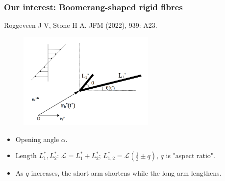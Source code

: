 \documentclass{beamer}
\newcommand{\bi}{\begin{itemize}}
\newcommand{\ei}{\end{itemize}}
\begin{document}
\begin{frame}
	\frametitle{Our interest: Boomerang-shaped rigid fibres}
	\begin{overlayarea}{\textwidth}{\textheight}
		\vspace{-0.5cm}\footnotesize Roggeveen J V, Stone H A. JFM (2022), 939: A23.\vspace{-0.2cm}
		\begin{figure}[htb]
			\begin{center}
				\includegraphics[width=0.6\textwidth]{plots/schematic/schematic_rigid_configuration.png}
			\end{center}
		\end{figure}\vspace{-0.3cm}
     	\small \bi
		\item Opening angle $\alpha$. 
		\item Length $L_1^*,L_2^*$: $\mathcal{L}=L_1^*+L_2^*;\, L_{1,2}^*=\mathcal{L}(\frac{1}{2}\pm q)$, $q$ is "aspect ratio".
	    \item As $q$ increases, the short arm shortens while the long arm lengthens.
	    \ei 
	\end{overlayarea}
\end{frame}


\end{document}

